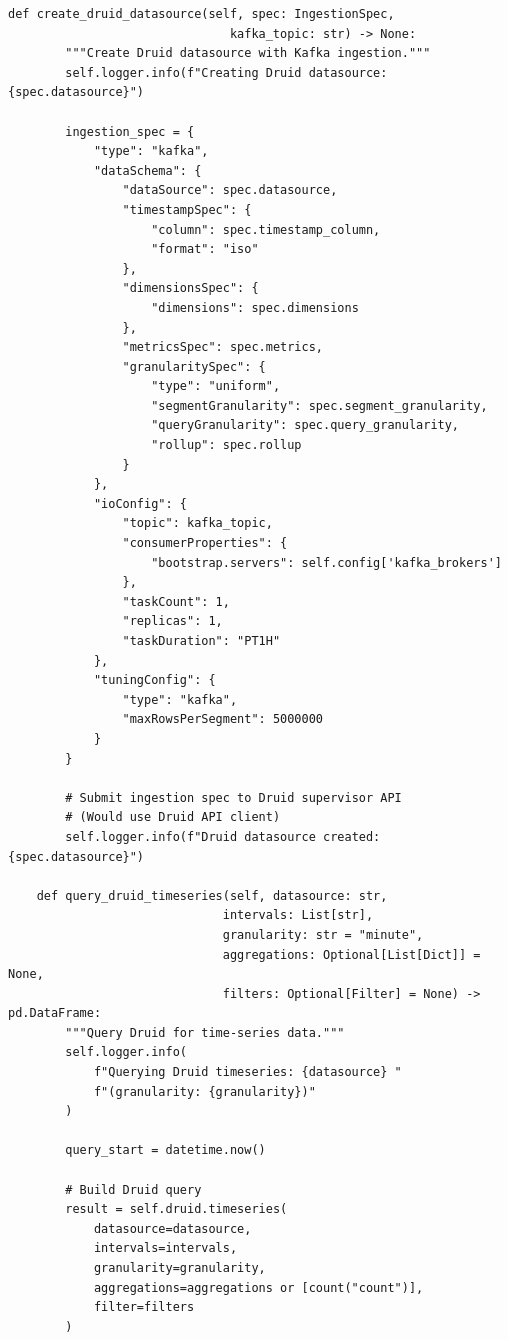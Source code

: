 \begin{lstlisting}[style=python, caption=RealtimeAnalyzer with Sub-Second Query Performance]
    def create_druid_datasource(self, spec: IngestionSpec,
                               kafka_topic: str) -> None:
        """Create Druid datasource with Kafka ingestion."""
        self.logger.info(f"Creating Druid datasource: {spec.datasource}")

        ingestion_spec = {
            "type": "kafka",
            "dataSchema": {
                "dataSource": spec.datasource,
                "timestampSpec": {
                    "column": spec.timestamp_column,
                    "format": "iso"
                },
                "dimensionsSpec": {
                    "dimensions": spec.dimensions
                },
                "metricsSpec": spec.metrics,
                "granularitySpec": {
                    "type": "uniform",
                    "segmentGranularity": spec.segment_granularity,
                    "queryGranularity": spec.query_granularity,
                    "rollup": spec.rollup
                }
            },
            "ioConfig": {
                "topic": kafka_topic,
                "consumerProperties": {
                    "bootstrap.servers": self.config['kafka_brokers']
                },
                "taskCount": 1,
                "replicas": 1,
                "taskDuration": "PT1H"
            },
            "tuningConfig": {
                "type": "kafka",
                "maxRowsPerSegment": 5000000
            }
        }

        # Submit ingestion spec to Druid supervisor API
        # (Would use Druid API client)
        self.logger.info(f"Druid datasource created: {spec.datasource}")

    def query_druid_timeseries(self, datasource: str,
                              intervals: List[str],
                              granularity: str = "minute",
                              aggregations: Optional[List[Dict]] = None,
                              filters: Optional[Filter] = None) -> pd.DataFrame:
        """Query Druid for time-series data."""
        self.logger.info(
            f"Querying Druid timeseries: {datasource} "
            f"(granularity: {granularity})"
        )

        query_start = datetime.now()

        # Build Druid query
        result = self.druid.timeseries(
            datasource=datasource,
            intervals=intervals,
            granularity=granularity,
            aggregations=aggregations or [count("count")],
            filter=filters
        )


\end{lstlisting}
